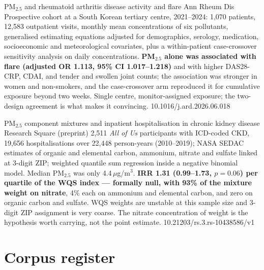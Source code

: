 \documentclass[10pt]{article}
\begin{document}

{PM$_{2.5}$ and rheumatoid arthritis disease activity and flare}
{Ann Rheum Dis}
{Prospective cohort at a South Korean tertiary centre, 2021--2024: 1{,}070 patients,
12{,}583 outpatient visits, monthly mean concentrations of six pollutants, generalised
estimating equations adjusted for demographics, serology, medication, socioeconomic and
meteorological covariates, plus a within-patient case-crossover sensitivity analysis on
daily concentrations. \textbf{PM$_{2.5}$ alone was associated with flare (adjusted OR
1.113, 95\% CI 1.017--1.218)} and with higher DAS28-CRP, CDAI, and tender and swollen
joint counts; the association was stronger in women and non-smokers, and the
case-crossover arm reproduced it for cumulative exposure beyond two weeks. Single centre,
monitor-assigned exposure; the two-design agreement is what makes it convincing.}
{10.1016/j.ard.2026.06.018}

{PM$_{2.5}$ component mixtures and inpatient hospitalisation in chronic kidney disease}
{Research Square (preprint)}
{2{,}511 \textit{All of Us} participants with ICD-coded CKD, 19{,}656 hospitalisations over
22{,}448 person-years (2010--2019); NASA SEDAC estimates of organic and elemental carbon,
ammonium, nitrate and sulfate linked at 3-digit ZIP; weighted quantile sum regression
inside a negative binomial model. Median PM$_{2.5}$ was only 4.4\,$\mu$g/m$^3$.
\textbf{IRR 1.31 (0.99--1.73, $p=0.06$) per quartile of the WQS index --- formally null,
with 93\% of the mixture weight on nitrate}, 4\% each on ammonium and elemental carbon,
and zero on organic carbon and sulfate. WQS weights are unstable at this sample size and
3-digit ZIP assignment is very coarse. The nitrate concentration of weight is the
hypothesis worth carrying, not the point estimate.}
{10.21203/rs.3.rs-10438586/v1}

\clearpage

\section*{\sffamily\bfseries\color{Deep}Corpus register}
\vspace{-1.5mm}{\color{Amber}\rule{\linewidth}{1.1pt}}\vspace{2.5mm}


\end{document}
